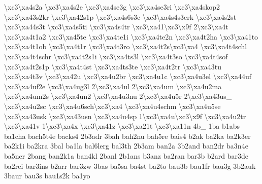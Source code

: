 {\textbackslash{}xc3\textbackslash{}xa4s2a \textbackslash{}xc3\textbackslash{}xa4s2e \textbackslash{}xc3\textbackslash{}xa4se3g \textbackslash{}xc3\textbackslash{}xa4se3ri \textbackslash{}xc3\textbackslash{}xa4skop2 \textbackslash{}xc3\textbackslash{}xa43s2kr \textbackslash{}xc3\textbackslash{}xa42s1p \textbackslash{}xc3\textbackslash{}xa4s6s3c \textbackslash{}xc3\textbackslash{}xa4s4s3erk \textbackslash{}xc3\textbackslash{}xa4s2st \textbackslash{}xc3\textbackslash{}xa44s3t \textbackslash{}xc3\textbackslash{}xa4s5ti \textbackslash{}xc3\textbackslash{}xa4s4tr \textbackslash{}xc3\textbackslash{}xa41\textbackslash{}xc3\textbackslash{}x9f 2\textbackslash{}xc3\textbackslash{}xa4t \textbackslash{}xc3\textbackslash{}xa4t1a2 \textbackslash{}xc3\textbackslash{}xa45te \textbackslash{}xc3\textbackslash{}xa4te1i \textbackslash{}xc3\textbackslash{}xa4te2n \textbackslash{}xc3\textbackslash{}xa4t2ha \textbackslash{}xc3\textbackslash{}xa41to \textbackslash{}xc3\textbackslash{}xa4t1ob \textbackslash{}xc3\textbackslash{}xa4t1r \textbackslash{}xc3\textbackslash{}xa4t3ro \textbackslash{}xc3\textbackslash{}xa4t2s\textbackslash{}xc3\textbackslash{}xa4 \textbackslash{}xc3\textbackslash{}xa4t4schl \textbackslash{}xc3\textbackslash{}xa4t4schr \textbackslash{}xc3\textbackslash{}xa4t2s1i \textbackslash{}xc3\textbackslash{}xa4ts3l \textbackslash{}xc3\textbackslash{}xa4t3so \textbackslash{}xc3\textbackslash{}xa4t4sof \textbackslash{}xc3\textbackslash{}xa4t2s1p \textbackslash{}xc3\textbackslash{}xa4t4st \textbackslash{}xc3\textbackslash{}xa4ts3te \textbackslash{}xc3\textbackslash{}xa4t2tr \textbackslash{}xc3\textbackslash{}xa43tu \textbackslash{}xc3\textbackslash{}xa4t3v \textbackslash{}xc3\textbackslash{}xa42u \textbackslash{}xc3\textbackslash{}xa4u2br \textbackslash{}xc3\textbackslash{}xa4u1c \textbackslash{}xc3\textbackslash{}xa4u3el \textbackslash{}xc3\textbackslash{}xa44uf \textbackslash{}xc3\textbackslash{}xa4uf2e \textbackslash{}xc3\textbackslash{}xa4ug3l 2\textbackslash{}xc3\textbackslash{}xa4ul 2\textbackslash{}xc3\textbackslash{}xa4um \textbackslash{}xc3\textbackslash{}xa4u2ma \textbackslash{}xc3\textbackslash{}xa4um2s \textbackslash{}xc3\textbackslash{}xa4un2 \textbackslash{}xc3\textbackslash{}xa4u3nu 2\textbackslash{}xc3\textbackslash{}xa4u5r 2\textbackslash{}xc3\textbackslash{}xa43us\-\_\- \textbackslash{}xc3\textbackslash{}xa4u2sc \textbackslash{}xc3\textbackslash{}xa4u6sch\textbackslash{}xc3\textbackslash{}xa4 \textbackslash{}xc3\textbackslash{}xa4u4schm \textbackslash{}xc3\textbackslash{}xa4u5se \textbackslash{}xc3\textbackslash{}xa43usk \textbackslash{}xc3\textbackslash{}xa43usn \textbackslash{}xc3\textbackslash{}xa4u4sp 1\textbackslash{}xc3\textbackslash{}xa4u\textbackslash{}xc3\textbackslash{}x9f \textbackslash{}xc3\textbackslash{}xa4u2tr \textbackslash{}xc3\textbackslash{}xa41v 1\textbackslash{}xc3\textbackslash{}xa4x \textbackslash{}xc3\textbackslash{}xa41z \textbackslash{}xc3\textbackslash{}xa21t \textbackslash{}xc3\textbackslash{}xa11n 4b\-\_\- 1ba b1abs ba1cha bach5t4e backs4 2b3adr 3bah bah2nu bah5re bais4 b2ak ba2ka ba2k3er ba2k1i ba2kra 3bal ba1la bal6lerg bal3th 2b3am ban2a 3b2and ban2dr ba3n4e ba5ner 2bang ban2k1a ban4kl 2banl 2b1ans b3anz ba2ran bar3b b2ard bar3de ba2rei bar3ins b2arr bar3zw 3bas ba5sa ba4st ba2to bau3b bau1fr bau3g 3b2auk 3baur bau3s bau1s2k ba1yo }

